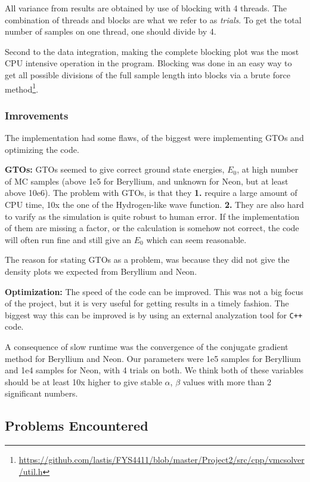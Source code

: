 \documentclass[twocolumns, a4paper,11pt,fleqn]{extarticle}
\begin{document}
All variance from results are obtained by use of blocking with 4 threads. 
The combination of threads and blocks are what we refer to as \textit{trials}. 
To get the total number of samples on one thread,
one should divide by 4.

Second to the data integration, making the complete blocking plot was the 
most CPU intensive operation in the program.
Blocking was done in an easy way to get all possible divisions of the full sample length
into blocks via a brute force method\footnote{\url{https://github.com/lastis/FYS4411/blob/master/Project2/src/cpp/vmcsolver/util.h}}.

\subsubsection{Imrovements}
The implementation had some flaws, of the biggest were implementing GTOs 
and optimizing the code. 

{\bf GTOs:} GTOs seemed to give correct ground state energies, $E_0$, 
at high number of MC samples (above 1e5 for Beryllium, and unknown for Neon, but at least
above 10e6). 
The problem with GTOs, is that they 
{\color{MediumBlue}\bf1.} require a large amount
of CPU time, 10x the one of the Hydrogen-like wave function. {\color{MediumBlue}\bf2.}
They are also hard to varify as the simulation is quite robust to human error. If 
the implementation of them are missing a factor, or the calculation is somehow not
correct, the code will often run fine and still give an $E_0$ which can seem reasonable. 

The reason for stating GTOs as a problem, was because they did not give the
density plots we expected from Beryllium and Neon.

{\bf Optimization:}
The speed of the code can be improved. This was not a big focus of the project, but
it is very useful for getting results in a timely fashion. The biggest way this
can be improved is by using an external analyzation tool for \verb!C++! code. 

A consequence of slow runtime was the convergence of 
the conjugate gradient method for Beryllium and Neon. 
Our parameters were 1e5 samples for Beryllium and 1e4 samples for Neon, with 4 trials
on both. We think both of these variables should be at least 10x higher to give
stable $\alpha$, $\beta$ values with more than 2 significant numbers.

\subsection{Problems Encountered}
\end{document}

